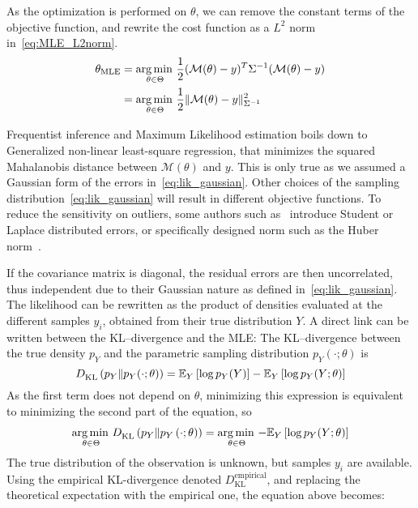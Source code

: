 \documentclass[../../Main_ManuscritThese.tex]{subfiles}
\begin{document}
As the optimization is performed on $\theta$, we can remove the constant terms of the objective function, and rewrite the cost function as a $L^2$ norm in~\cref{eq:MLE_L2norm}.  %
  \begin{align}
    {\theta}_{\mathrm{MLE}} &= \operatorname*{arg\,min \,}_{\theta \in \Theta}\frac{1}{2}(\mathcal{M}(\theta) - y)^T\Sigma^{-1}(\mathcal{M}(\theta) - y) \nonumber\\
                           &= \operatorname*{arg\,min \,}_{\theta \in \Theta}\frac12 \| \mathcal{M}(\theta) - y \|^2_{\Sigma^{-1}} \label{eq:MLE_L2norm}
  \end{align}

  Frequentist inference and Maximum Likelihood estimation boils down to Generalized non-linear least-square regression, that minimizes the squared Mahalanobis distance between $\mathcal{M}({\theta})$ and $y$. This is only true as we assumed a Gaussian form of the errors in~\cref{eq:lik_gaussian}. Other choices of the sampling distribution~\cref{eq:lik_gaussian} will result in different objective functions. To reduce the sensitivity on outliers, some authors such as~\cite{rao_robust_2015} introduce Student or Laplace distributed errors, or specifically designed norm such as the Huber norm~\cite{huber_robust_2011}.

  If the covariance matrix is diagonal, the residual errors are then uncorrelated, thus independent due to their Gaussian nature as defined in~\cref{eq:lik_gaussian}. The likelihood can be rewritten as the product of densities evaluated at the different samples $y_i$, obtained from their true distribution $Y$.
  A direct link can be written between the KL--divergence and the MLE:
  The KL--divergence between the true density $p_Y$ and the parametric sampling distribution $p_Y(\cdot;\theta)$ is
  \begin{equation}
  D^{\mathrm{}}_{\mathrm{KL}}\left(p_Y \| p_Y(\cdot;\theta)\right) = \mathbb{E}_Y\left[\log p_Y(Y)\right]-\mathbb{E}_Y\left[\log p_Y(Y;\theta)\right]  
\end{equation}
As the first term does not depend on $\theta$, minimizing this expression is equivalent to minimizing the second part of the equation, so
\begin{align}
 \operatorname*{arg\,min \,}_{\theta \in\Theta} D^{\mathrm{}}_{\mathrm{KL}}\left(p_Y \| p_Y\left(\cdot;\theta \right)\right) = \operatorname*{arg\,min \,}_{\theta \in \Theta} -\mathbb{E}_{Y}\left[\log p_{Y}(Y ; \theta)\right]
\end{align}
The true distribution of the observation is unknown, but samples $y_i$ are available. Using the empirical KL-divergence denoted $D^{\mathrm{empirical}}_{\mathrm{KL}}$,  and replacing the theoretical expectation with the empirical one, the equation above becomes:
\end{document}
